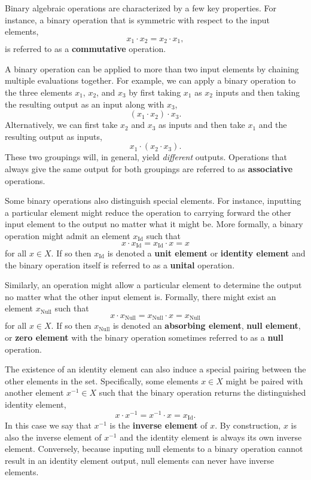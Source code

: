 \documentclass[
  letterpaper,
  DIV=11,
  numbers=noendperiod]{scrartcl}
\begin{document}
Binary algebraic operations are characterized by a few key properties.
For instance, a binary operation that is symmetric with respect to the
input elements, \[
x_{1} \cdot x_{2} = x_{2} \cdot x_{1},
\] is referred to as a \textbf{commutative} operation.

A binary operation can be applied to more than two input elements by
chaining multiple evaluations together. For example, we can apply a
binary operation to the three elements \(x_{1}\), \(x_{2}\), and
\(x_{3}\) by first taking \(x_{1}\) as \(x_{2}\) inputs and then taking
the resulting output as an input along with \(x_{3}\), \[
(x_{1} \cdot x_{2}) \cdot x_{3}.
\] Alternatively, we can first take \(x_{2}\) and \(x_{3}\) as inputs
and then take \(x_{1}\) and the resulting output as inputs, \[
x_{1} \cdot (x_{2} \cdot x_{3}).
\] These two groupings will, in general, yield \emph{different} outputs.
Operations that always give the same output for both groupings are
referred to as \textbf{associative} operations.

Some binary operations also distinguish special elements. For instance,
inputting a particular element might reduce the operation to carrying
forward the other input element to the output no matter what it might
be. More formally, a binary operation might admit an element
\(x_{\text{Id}}\) such that \[
x \cdot x_{\text{Id}} = x_{\text{Id}} \cdot x = x
\] for all \(x \in X\). If so then \(x_{\text{Id}}\) is denoted a
\textbf{unit element} or \textbf{identity element} and the binary
operation itself is referred to as a \textbf{unital} operation.

Similarly, an operation might allow a particular element to determine
the output no matter what the other input element is. Formally, there
might exist an element \(x_{\text{Null}}\) such that \[
x \cdot x_{\text{Null}}
=
x_{\text{Null}} \cdot x
=
x_{\text{Null}}
\] for all \(x \in X\). If so then \(x_{\text{Null}}\) is denoted an
\textbf{absorbing element}, \textbf{null element}, or \textbf{zero
element} with the binary operation sometimes referred to as a
\textbf{null} operation.

The existence of an identity element can also induce a special pairing
between the other elements in the set. Specifically, some elements
\(x \in X\) might be paired with another element \(x^{-1} \in X\) such
that the binary operation returns the distinguished identity element, \[
x \cdot x^{-1} = x^{-1} \cdot x = x_{\text{Id}}.
\] In this case we say that \(x^{-1}\) is the \textbf{inverse element}
of \(x\). By construction, \(x\) is also the inverse element of
\(x^{-1}\) and the identity element is always its own inverse element.
Conversely, because inputing null elements to a binary operation cannot
result in an identity element output, null elements can never have
inverse elements.
\end{document}
